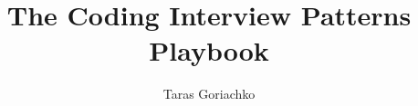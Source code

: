 \documentclass{beamer}
\title{The Coding Interview Patterns Playbook}
\author{Taras Goriachko}
\date{}
\begin{document}
\begin{frame}
  \titlepage
\end{frame}























\end{document}
